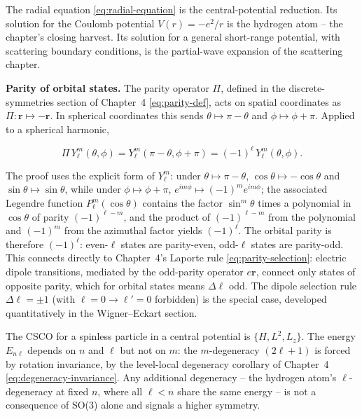 The radial equation \eqref{eq:radial-equation} is the central-potential reduction. Its solution for the Coulomb potential $V(r) = -e^2/r$ is the hydrogen atom -- the chapter's closing harvest. Its solution for a general short-range potential, with scattering boundary conditions, is the partial-wave expansion of the scattering chapter.

\medskip\noindent\textbf{Parity of orbital states.}
The parity operator $\Pi$, defined in the discrete-symmetries section of Chapter~4 \eqref{eq:parity-def}, acts on spatial coordinates as $\Pi: \bm r \mapsto -\bm r$. In spherical coordinates this sends $\theta \mapsto \pi - \theta$ and $\phi \mapsto \phi + \pi$. Applied to a spherical harmonic,
\begin{linenomath}
  \begin{equation}
    \Pi\,Y_\ell^m(\theta,\phi)
    = Y_\ell^m(\pi - \theta, \phi + \pi)
    = (-1)^\ell\,Y_\ell^m(\theta,\phi).
    \label{eq:Ylm-parity}
  \end{equation}
\end{linenomath}
The proof uses the explicit form of $Y_\ell^m$: under $\theta \mapsto \pi-\theta$, $\cos\theta \mapsto -\cos\theta$ and $\sin\theta \mapsto \sin\theta$, while under $\phi \mapsto \phi+\pi$, $e^{im\phi} \mapsto (-1)^m e^{im\phi}$; the associated Legendre function $P_\ell^m(\cos\theta)$ contains the factor $\sin^m\theta$ times a polynomial in $\cos\theta$ of parity $(-1)^{\ell-m}$, and the product of $(-1)^{\ell-m}$ from the polynomial and $(-1)^m$ from the azimuthal factor yields $(-1)^\ell$. The orbital parity is therefore $(-1)^\ell$: even-$\ell$ states are parity-even, odd-$\ell$ states are parity-odd. This connects directly to Chapter~4's Laporte rule \eqref{eq:parity-selection}: electric dipole transitions, mediated by the odd-parity operator $e\bm r$, connect only states of opposite parity, which for orbital states means $\Delta\ell$ odd. The dipole selection rule $\Delta\ell = \pm1$ (with $\ell = 0 \to \ell' = 0$ forbidden) is the special case, developed quantitatively in the Wigner--Eckart section.

The CSCO for a spinless particle in a central potential is $\{H, L^2, L_z\}$. The energy $E_{n\ell}$ depends on $n$ and $\ell$ but not on $m$: the $m$-degeneracy $(2\ell+1)$ is forced by rotation invariance, by the level-local degeneracy corollary of Chapter~4 \eqref{eq:degeneracy-invariance}. Any additional degeneracy -- the hydrogen atom's $\ell$-degeneracy at fixed $n$, where all $\ell < n$ share the same energy -- is not a consequence of SO(3) alone and signals a higher symmetry.

